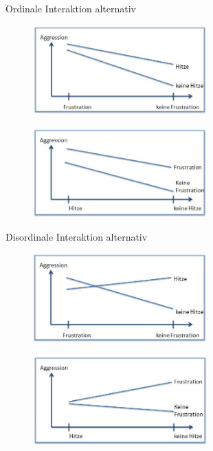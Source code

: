 \documentclass{beamer}
\begin{document}
	\begin{frame}{Ordinale Interaktion alternativ}
		\begin{figure}
			\centering
			\includegraphics[width=0.6\textwidth]{Bilder/OrdinaleInteraktion1.jpg}
		\end{figure}
		\begin{figure}
			\centering
			\includegraphics[width=0.6\textwidth]{Bilder/OrdinaleInteraktion2.jpg}
		\end{figure}
	\end{frame}
	
	
	\begin{frame}{Disordinale Interaktion alternativ}
		\begin{figure}
			\centering
			\includegraphics[width=0.6\textwidth]{Bilder/DisordinaleInteraktion1.jpg}
		\end{figure}
		\begin{figure}
			\centering
			\includegraphics[width=0.6\textwidth]{Bilder/DisordinaleInteraktion2.jpg}
		\end{figure}
	\end{frame}
	
\end{document}
